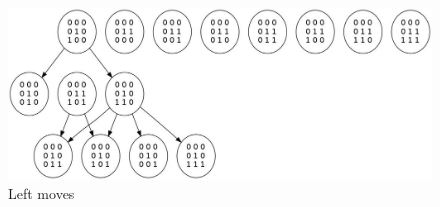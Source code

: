 \documentclass[11pt, a4paper]{article}
\theoremstyle{plain}
\theoremstyle{definition}
\theoremstyle{remark}
\begin{document}
\begin{figure}
\includegraphics[scale=0.50, angle=00]{graph_images/graph_leftmost_left.jpg}
\caption{Left moves}
\label{graph:leftmost_left}
\end{figure}
\end{document}
